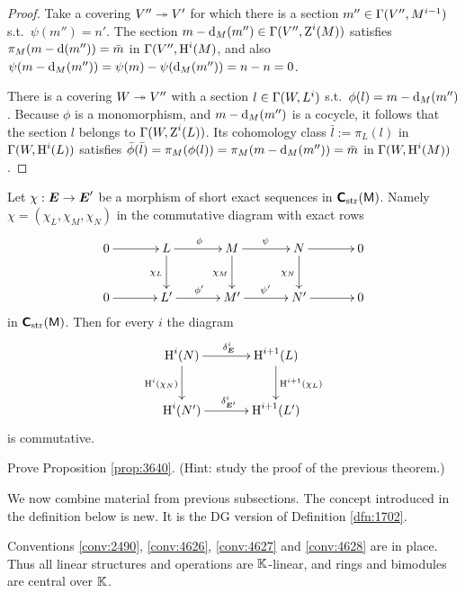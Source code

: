 \begin{proof}
Take a covering $V'' \twoheadrightarrow V'$ for which there is a section 
$m'' \in \Gamma(V'', M^{i - 1})$ s.t.\ 
$\psi(m'') = n'$. The section 
$m - \mathrm{d}_M(m'') \in \Gamma(V'', \operatorname{Z}^{i}(M))$
satisfies $\pi_M(m - \mathrm{d}(m'')) = \bar{m}$ in 
$\Gamma(V'', \operatorname{H}^{i}(M)$, and also 
$\psi(m - \mathrm{d}_M(m'')) = \psi(m) - \psi(\mathrm{d}_M(m'')) = n - n = 0$.

There is a covering $W \twoheadrightarrow V''$ with a section 
$l \in \Gamma(W, L^i)$ s.t.\ $\phi(l) = m - \mathrm{d}_M(m'')$. 
Because $\phi$ is a monomorphism, and $m - \mathrm{d}_M(m'')$ is a cocycle, it follows 
that the section $l$ belongs to 
$\Gamma(W, \operatorname{Z}^{i}(L))$. Its cohomology class 
$\bar{l} := \pi_L(l)$ in $\Gamma(W, \operatorname{H}^{i}(L))$
satisfies 
$\bar{\phi}(\bar{l}) = \pi_M(\phi(l)) = \pi_M(m - \mathrm{d}_M(m'')) = \bar{m}$
in $\Gamma(W, \operatorname{H}^{i}(M))$.  
\end{proof}

\begin{prop} \label{prop:3640}
Let $\chi : \boldsymbol{E} \to \boldsymbol{E}'$ be a morphism of short exact sequences in 
$\boldsymbol{\mathsf{C}}_{\mathrm{str}}(\operatorname{\mathsf{M}})$. Namely 
$\chi = (\chi_L, \chi_M, \chi_N)$ in the commutative diagram with exact rows
\[ \UseTips \xymatrix @C=8ex @R=6ex {
0
\ar[r]
&
L
\ar[r]^{\phi}
\ar[d]_{\chi_L}
&
M
\ar[r]^{\psi}
\ar[d]_{\chi_M}
&
N
\ar[r]
\ar[d]_{\chi_N}
&
0
\\
0
\ar[r]
&
L'
\ar[r]^{\phi'}
&
M'
\ar[r]^{\psi'}
&
N'
\ar[r]
&
0
} \]
in $\boldsymbol{\mathsf{C}}_{\mathrm{str}}(\operatorname{\mathsf{M}})$. Then for every $i$ the diagram 
\[ \UseTips \xymatrix @C=8ex @R=6ex {
\opn{H}^{i}(N) 
\ar[r]^{\de_{\bsym{E}}^i}
\ar[d]_{\opn{H}^{i}(\chi_N)}
&
\opn{H}^{i + 1}(L)
\ar[d]^{\opn{H}^{i + 1}(\chi_L)}
\\
\opn{H}^{i}(N') 
\ar[r]^{\de_{\bsym{E}'}^i}
&
\opn{H}^{i + 1}(L')
} \]
is commutative. 
\end{prop}

\begin{exer} \label{exer:3640}
Prove Proposition \ref{prop:3640}. (Hint: study the proof of the previous 
theorem.)
\end{exer}
 




\label{subsec:DGModinM}

We now combine material from previous subsections. The concept introduced in 
the definition below is new. It is the DG version of Definition 
\ref{dfn:1702}. 

Conventions \ref{conv:2490}, \ref{conv:4626}, \ref{conv:4627} and 
\ref{conv:4628} are in place. Thus all linear structures and operations 
are $\mathbb{K}$-linear, and rings and bimodules are central over $\mathbb{K}$. 

